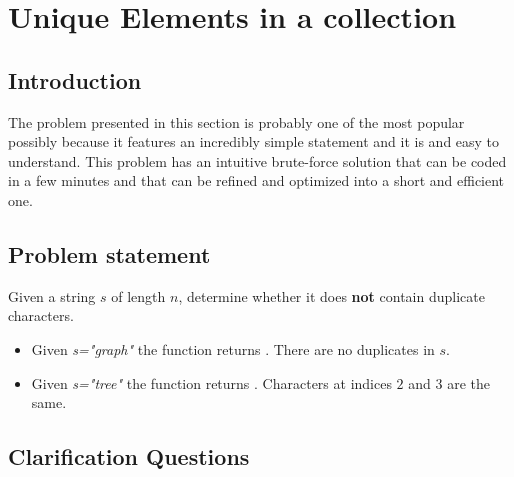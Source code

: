 %


\chapter{Unique Elements in a collection}
\label{ch:unique_elements}
\section*{Introduction}
The problem presented in this section is probably one of the most popular
possibly because it features an incredibly simple statement and it is and easy to understand.
This problem has an intuitive brute-force solution that can be coded in a few minutes and that
can be refined and optimized into a short and efficient one. 

\section{Problem statement}
\begin{exercise}
Given a string $s$ of length $n$, determine whether it does \textbf{not} contain duplicate characters. 

\begin{example}
\hfill
	\begin{itemize}
		\item Given \textit{s="graph"} the function returns . There are no duplicates  in $s$.
		\item Given \textit{s="tree"} the function returns . Characters at indices $2$ and $3$  are the same.
	\end{itemize}
\end{example}

\end{exercise}

\section{Clarification Questions}

